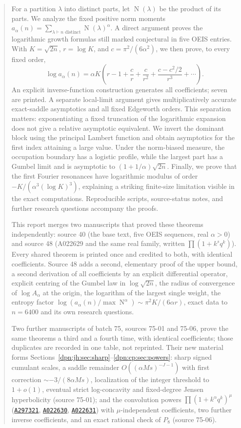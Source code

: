 \documentclass[11pt]{article}
\numberwithin{equation}{section}
\theoremstyle{definition}\newtheorem{definition}[theorem]{Definition}
\theoremstyle{remark}\newtheorem{remark}[theorem]{Remark}
\newcommand{\normp}{\operatorname{N}}
\newcommand{\OEIS}[1]{\href{https://oeis.org/#1}{\texttt{#1}}}
\begin{document}
\begin{abstract}
For a partition $\lambda$ into distinct parts, let $\normp(\lambda)$ be the
product of its parts. We analyze the fixed positive norm moments
$a_\alpha(n)=\sum_{\lambda\vdash n\text{ distinct}}\normp(\lambda)^\alpha$.
A direct argument proves the logarithmic growth formulas still marked
conjectural in five OEIS entries. With $K=\sqrt{2n}$, $r=\log K$, and
$c=\pi^2/(6\alpha^2)$, we then prove, to every fixed order,
\[
 \log a_\alpha(n)=\alpha K\left(r-1+\frac c r+\frac c{r^2}
 +\frac{c-c^2/2}{r^3}+\cdots\right).
\]
An explicit inverse-function construction generates all coefficients; seven are
printed. A separate local-limit argument gives multiplicatively accurate
exact-saddle asymptotics and all fixed Edgeworth orders. This separation matters:
exponentiating a fixed truncation of the logarithmic expansion does not give a
relative asymptotic equivalent. We invert the dominant block using the principal
Lambert function and obtain asymptotics for the first index attaining a large
value. Under the norm-biased measure, the occupation boundary has a logistic
profile, while the largest part has a Gumbel limit and is asymptotic to
$(1+1/\alpha)\sqrt{2n}$. Finally, we prove that the first Fourier resonances have
logarithmic modulus of order $-K/(\alpha^3(\log K)^3)$, explaining a striking
finite-size limitation visible in the exact computations. Reproducible scripts,
source-status notes, and further research questions accompany the proofs.

This report merges two manuscripts that proved these theorems independently:
source 40 (the base text, five OEIS sequences, real $\alpha>0$) and source 48
(A022629 and the same real family, written $\prod(1+k^sq^k)$). Every shared
theorem is printed once and credited to both, with identical coefficients.
Source 48 adds a second, elementary proof of the upper bound, a second
derivation of all coefficients by an explicit differential operator, explicit
centring of the Gumbel law in $\log\sqrt{2n}$, the radius of convergence of
$\log A_\alpha$ at the origin, the logarithm of the largest single weight, the
entropy factor $\log(a_\alpha(n)/\max\normp^\alpha)\sim\pi^2K/(6\alpha r)$,
exact data to $n=6400$ and its own research questions.

Two further manuscripts of batch 75, sources 75-01 and 75-06, prove the same
theorems a third and a fourth time, with identical coefficients; those
duplicates are recorded in one table, not reprinted.  Their new material forms
Sections~\ref{dpn:jh:sec:sharp}--\ref{dpn:cp:sec:powers}: sharp signed
cumulant scales, a saddle remainder $O((\alpha Ms)^{-J-1})$ with first
correction $\sim-3/(8\alpha Ms)$, localization of the integer threshold to
$1+o(1)$, eventual strict log-concavity and fixed-degree Jensen hyperbolicity
(source 75-01); and the convolution powers $\prod(1+k^\alpha q^k)^\mu$
(\OEIS{A297321}, \OEIS{A022630}, \OEIS{A022631}) with $\mu$-independent
coefficients, two further inverse coefficients, and an exact rational check
of $P_8$ (source 75-06).


\end{abstract}
\end{document}
